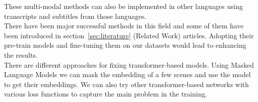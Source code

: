 These multi-modal methods can also be implemented in other languages using transcripts and subtitles from those languages.
\\
There have been major successful methods in this field and some of them have been introduced in section~\ref{sec:literature} (Related Work) articles. Adopting their pre-train models and fine-tuning them on our datasets would lead to enhancing the results.
\\
There are different approaches for fixing transformer-based models. Using Masked Language Models we can mask the embedding of a few scenes and use the model to get their embeddings. We can also try other transformer-based networks with various loss functions to capture the main problem in the training. 



%

